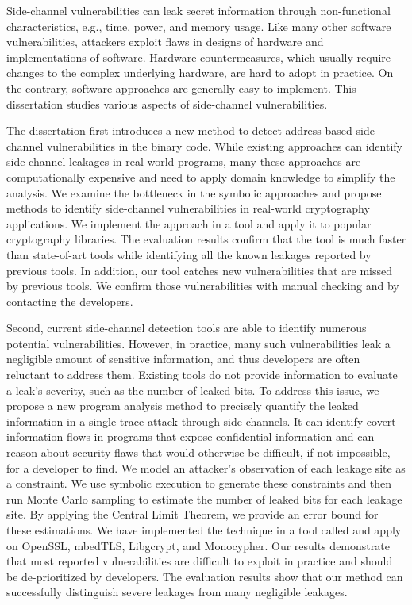 
\vspace{-0.3in}
Side-channel vulnerabilities can leak secret information through non-functional characteristics, e.g., time, power, and memory usage. Like many other software vulnerabilities, attackers exploit flaws in designs of hardware and implementations of software. Hardware countermeasures, which usually require changes to the complex underlying hardware, are hard to adopt in practice. On the contrary, software approaches are generally easy to implement. This dissertation studies various aspects of side-channel vulnerabilities.

The dissertation first introduces a new method to detect address-based side-channel vulnerabilities in the binary code. While existing approaches can identify side-channel leakages in real-world programs, many these approaches are computationally expensive and need to apply domain knowledge to simplify the analysis.  We examine the bottleneck in the symbolic approaches and propose methods to identify side-channel vulnerabilities in real-world cryptography applications. We implement the approach in a tool and apply it to popular cryptography libraries. The evaluation results confirm that the tool is much faster than state-of-art tools while identifying all the known leakages reported by previous tools. In addition, our tool catches new vulnerabilities that are missed by previous tools. We confirm those vulnerabilities with manual checking and by contacting the developers.

Second, current side-channel detection tools are able to identify numerous potential vulnerabilities. However, in practice, many such vulnerabilities leak a negligible amount of sensitive information, and thus developers are often reluctant to address them. Existing tools do not provide information to evaluate a leak’s severity, such as the number of leaked bits. To address this issue, we propose a new program analysis method to precisely quantify the leaked information in a single-trace attack through side-channels. It can identify covert information flows in programs that expose confidential information and can reason about security flaws that would otherwise be difficult, if not impossible, for a developer to find. We model an attacker’s observation of each leakage site as a constraint. We use symbolic execution to generate these constraints and then run Monte Carlo sampling to estimate the number of leaked bits for each leakage site. By applying the Central Limit Theorem, we provide an error bound for these estimations. We have implemented the technique in a tool called \tool{} and apply \tool{} on OpenSSL, mbedTLS, Libgcrypt, and Monocypher. Our results demonstrate that most reported vulnerabilities are difficult to exploit in practice and should be de-prioritized by developers. The evaluation results show that our method can successfully distinguish severe leakages from many negligible leakages. 

